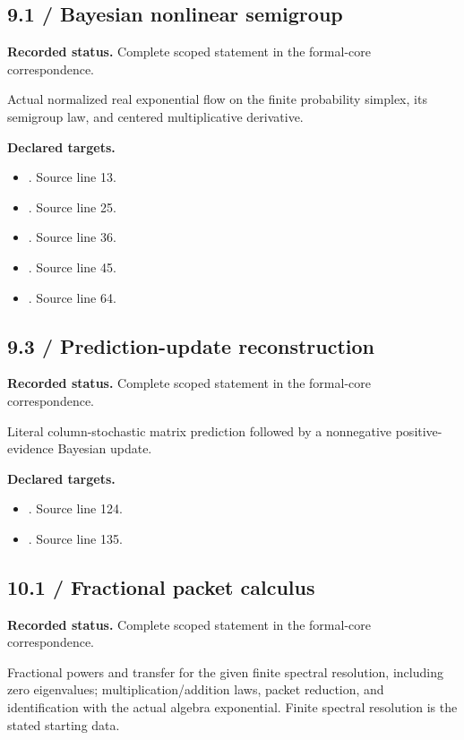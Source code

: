 \subsection{9.1 / Bayesian nonlinear semigroup}
\label{result:9.1}
\textbf{Recorded status.} Complete scoped statement in the formal-core correspondence.\par
Actual normalized real exponential flow on the finite probability simplex, its semigroup law, and centered multiplicative derivative.

\textbf{Declared targets.}\begin{itemize}
\item {}. Source line 13.
\item {}. Source line 25.
\item {}. Source line 36.
\item {}. Source line 45.
\item {}. Source line 64.
\end{itemize}
\subsection{9.3 / Prediction-update reconstruction}
\label{result:9.3}
\textbf{Recorded status.} Complete scoped statement in the formal-core correspondence.\par
Literal column-stochastic matrix prediction followed by a nonnegative positive-evidence Bayesian update.

\textbf{Declared targets.}\begin{itemize}
\item {}. Source line 124.
\item {}. Source line 135.
\end{itemize}
\subsection{10.1 / Fractional packet calculus}
\label{result:10.1}
\textbf{Recorded status.} Complete scoped statement in the formal-core correspondence.\par
Fractional powers and transfer for the given finite spectral resolution, including zero eigenvalues; multiplication/addition laws, packet reduction, and identification with the actual algebra exponential. Finite spectral resolution is the stated starting data.

